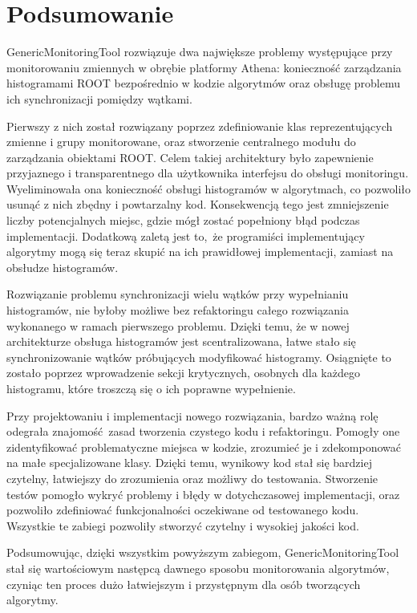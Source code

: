 \section{Podsumowanie}
GenericMonitoringTool rozwiązuje dwa największe problemy występujące przy monitorowaniu zmiennych w obrębie platformy Athena: konieczność zarządzania histogramami ROOT bezpośrednio w kodzie algorytmów oraz obsługę problemu ich synchronizacji pomiędzy wątkami.

Pierwszy z nich został rozwiązany poprzez zdefiniowanie klas reprezentujących zmienne i grupy monitorowane, oraz stworzenie centralnego modułu do zarządzania obiektami ROOT. 
Celem takiej architektury było zapewnienie przyjaznego i transparentnego dla użytkownika interfejsu do obsługi monitoringu.
Wyeliminowała ona konieczność obsługi histogramów w algorytmach, co pozwoliło usunąć z nich zbędny i powtarzalny kod.
Konsekwencją tego jest zmniejszenie liczby potencjalnych miejsc, gdzie mógł zostać popełniony błąd podczas implementacji.
Dodatkową zaletą jest to, że programiści implementujący algorytmy mogą się teraz skupić na ich prawidłowej implementacji, zamiast na obsłudze histogramów.

Rozwiązanie problemu synchronizacji wielu wątków przy wypełnianiu histogramów, nie byłoby możliwe bez refaktoringu całego rozwiązania wykonanego w ramach pierwszego problemu.
Dzięki temu, że w nowej architekturze obsługa histogramów jest scentralizowana, łatwe stało się synchronizowanie wątków próbujących modyfikować histogramy. 
Osiągnięte to zostało poprzez wprowadzenie sekcji krytycznych, osobnych dla każdego histogramu, które troszczą się o ich poprawne wypełnienie.

Przy projektowaniu i implementacji nowego rozwiązania, bardzo ważną rolę odegrała znajomość zasad tworzenia czystego kodu i refaktoringu. 
Pomogły one zidentyfikować problematyczne miejsca w kodzie, zrozumieć je i zdekomponować na małe specjalizowane klasy. 
Dzięki temu, wynikowy kod stał się bardziej czytelny, łatwiejszy do zrozumienia oraz możliwy do testowania.
Stworzenie testów pomogło wykryć problemy i błędy w dotychczasowej implementacji, oraz pozwoliło zdefiniować funkcjonalności oczekiwane od testowanego kodu. 
Wszystkie te zabiegi pozwoliły stworzyć czytelny i wysokiej jakości kod. 

Podsumowując, dzięki wszystkim powyższym zabiegom, GenericMonitoringTool stał się wartościowym następcą dawnego sposobu monitorowania algorytmów, czyniąc ten proces dużo łatwiejszym i przystępnym dla osób tworzących algorytmy.